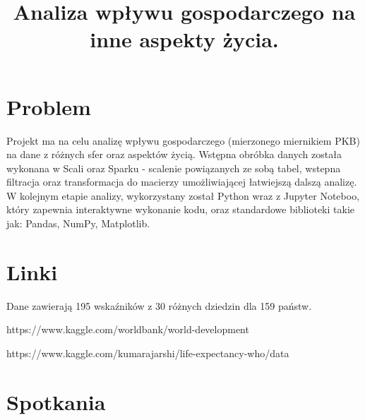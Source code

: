 \documentclass{article}
\title{Analiza wpływu gospodarczego na inne aspekty życia.}
\begin{document}
\maketitle

\section{Problem}
Projekt ma na celu analizę wpływu gospodarczego (mierzonego miernikiem PKB) na dane z różnych sfer oraz aspektów życią.
Wstępna obróbka danych została wykonana w Scali oraz Sparku - scalenie powiązanych ze sobą tabel, wstepna filtracja oraz transformacja do
macierzy umożliwiającej łatwiejszą dalszą analizę. W kolejnym etapie analizy, wykorzystany został Python wraz z Jupyter Noteboo, który zapewnia
interaktywne wykonanie kodu, oraz standardowe biblioteki takie jak: Pandas, NumPy, Matplotlib.


\section{Linki}

Dane zawierają 195 wskaźników z 30 różnych dziedzin dla 159 państw.

https://www.kaggle.com/worldbank/world-development

https://www.kaggle.com/kumarajarshi/life-expectancy-who/data


\clearpage


\section{Spotkania}
\end{document}
